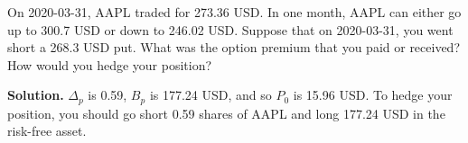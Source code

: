 \noindent On 2020-03-31, AAPL traded for 273.36 USD. In one month, AAPL can either go up to 300.7 USD or down to 246.02 USD. Suppose that on 2020-03-31, you went short a 268.3 USD put. What was the option premium that you paid or received? How would you hedge your position?

\vspace{9pt}

\noindent\textbf{Solution.} $\Delta_{p}$ is 0.59, $B_{p}$ is 177.24 USD, and so $P_{0}$ is 15.96 USD. To hedge your position, you should go short 0.59 shares of AAPL and long 177.24 USD in the risk-free asset.